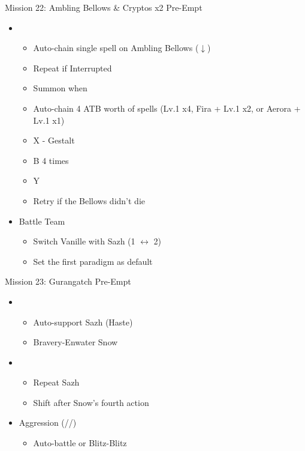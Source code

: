 \begin{multicols}{2}
\begin{battle}[0:26]{Mission 22: Ambling Bellows \& Cryptos x2 Pre-Empt}
		\begin{itemize}
			\item \second
			      \begin{itemize}
				      \item Auto-chain single spell on Ambling Bellows ($\downarrow$)
				      \item Repeat if Interrupted
				      \item Summon when \stagger\
				      \item Auto-chain 4 ATB worth of spells (Lv.1 x4, Fira + Lv.1 x2, or Aerora + Lv.1 x1)
				      \item X - Gestalt
				      \item B 4 times
				      \item Y
				      \item Retry if the Bellows didn't die
			      \end{itemize}
		\end{itemize}
	\end{battle}

	\renewcommand{\sixth}{[6] Aggression (\com/\rav/\com)}

	\begin{menu}
		\begin{itemize}
			\paradigm
			\begin{itemize}
				\item Battle Team
				      \begin{itemize}
					      \item Switch Vanille with Sazh (1 $\leftrightarrow$ 2)
					      \item Set the first paradigm as default
				      \end{itemize}
			\end{itemize}
		\end{itemize}
	\end{menu}
	\vfill
	\begin{battle}[0:22]{Mission 23: Gurangatch Pre-Empt}
		\begin{itemize}
			\item \first
			      \begin{itemize}
				      \item Auto-support Sazh (Haste)
				      \item Bravery-Enwater Snow
			      \end{itemize}
			\item \fifth
			      \begin{itemize}
				      \item Repeat Sazh
				      \item Shift after Snow's fourth action
			      \end{itemize}
			\item \sixth
			      \begin{itemize}
				      \item Auto-battle or Blitz-Blitz
			      \end{itemize}
		\end{itemize}
	\end{battle}


\end{multicols}
